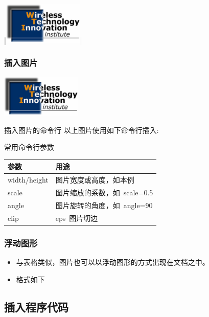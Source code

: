 \vbgraph|\includegraphics[height=2cm]{figures/wti-logo}|
\begin{frame}
	\frametitle{插入图片}
	\begin{center}
		\includegraphics[height=2cm]{figures/wti-logo}
	\end{center}
	\begin{overprint}
		\begin{block}{插入图片的命令行}
			以上图片使用如下命令行插入:
			
			\fbox{\vbgraph}	
		\end{block}
		\begin{block}{常用命令行参数}
			\begin{tabular}[t]{lp{8cm}}
				\hline
				\hline
				参数	& 用途 \\
				\hline
				width/height	& 图片宽度或高度，如本例\\
				scale	& 图片缩放的系数，如~scale=0.5\\
				angle	& 图片旋转的角度，如~angle=90\\
				clip	& eps~图片切边\\
				\hline
				\hline
			\end{tabular}
		\end{block}
	\end{overprint}
\end{frame}

\begin{frame}
	\frametitle{浮动图形}
	\begin{itemize}
		\item 与表格类似，图片也可以以浮动图形的方式出现在文档之中。
		\item 格式如下
			
	\end{itemize}
\end{frame}

\subsection{插入程序代码}

